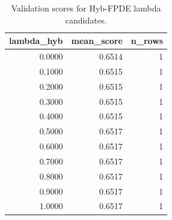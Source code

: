 \begin{table}[t]
\caption{Validation scores for Hyb-FPDE lambda candidates.}
\label{tab:lambda_distribution_computed}
\centering
\begin{tabular}{rrr}
\toprule
lambda\_hyb & mean\_score & n\_rows \\
\midrule
0.0000 & 0.6514 & 1 \\
0.1000 & 0.6515 & 1 \\
0.2000 & 0.6515 & 1 \\
0.3000 & 0.6515 & 1 \\
0.4000 & 0.6515 & 1 \\
0.5000 & 0.6517 & 1 \\
0.6000 & 0.6517 & 1 \\
0.7000 & 0.6517 & 1 \\
0.8000 & 0.6517 & 1 \\
0.9000 & 0.6517 & 1 \\
1.0000 & 0.6517 & 1 \\
\bottomrule
\end{tabular}

\end{table}

